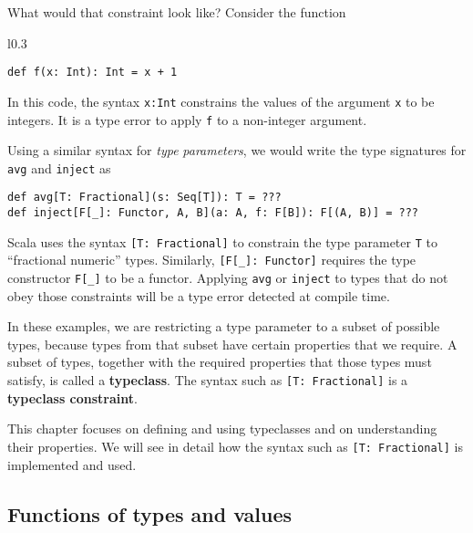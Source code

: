 What would that constraint look like? Consider the function

\begin{wrapfigure}{l}{0.3\columnwidth}%
\vspace{-0.85\baselineskip}
\begin{lstlisting}
def f(x: Int): Int = x + 1
\end{lstlisting}

\vspace{-0.95\baselineskip}
\end{wrapfigure}%

\noindent In this code, the syntax \lstinline!x:Int! constrains the
values of the argument \lstinline!x! to be integers. It is a type
error to apply \lstinline!f! to a non-integer argument. 

Using a similar syntax for \emph{type} \emph{parameters}, we would
write the type signatures for \lstinline!avg! and \lstinline!inject!
as
\begin{lstlisting}
def avg[T: Fractional](s: Seq[T]): T = ???
def inject[F[_]: Functor, A, B](a: A, f: F[B]): F[(A, B)] = ???
\end{lstlisting}
Scala uses the syntax \lstinline![T: Fractional]! to constrain the
type parameter \lstinline!T! to ``fractional numeric'' types. Similarly,
\lstinline![F[_]: Functor]! requires the type constructor \lstinline!F[_]!
to be a functor. Applying \lstinline!avg! or \lstinline!inject!
to types that do not obey those constraints will be a type error detected
at compile time.

In these examples, we are restricting a type parameter to a subset
of possible types, because types from that subset have certain properties
that we require. A subset of types, together with the required properties
that those types must satisfy, is called a \textbf{typeclass}.
The syntax such as \lstinline![T: Fractional]! is a \textbf{typeclass
constraint}. 

This chapter focuses on defining and using typeclasses and on understanding
their properties. We will see in detail how the syntax such as \lstinline![T: Fractional]!
is implemented and used.

\subsection{Functions of types and values}

